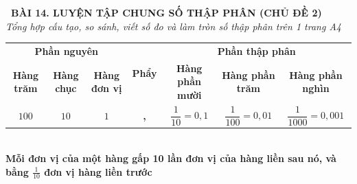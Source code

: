 \documentclass[14pt,a4paper,oneside]{extbook}
\begin{document}
\noindent
\begin{tcolorbox}[
  enhanced,
  colback=teal!8!white,
  colframe=teal!80!black,
  arc=3mm,
  boxrule=1.1pt,
  width=\linewidth,
  halign=center,
  top=2.2mm, bottom=2.2mm,
  left=3mm, right=3mm,
  drop fuzzy shadow
]
  {\large\bfseries\color{teal!95!black}\faBookmark\ BÀI 14. LUYỆN TẬP CHUNG SỐ THẬP PHÂN (CHỦ ĐỀ 2)}\\[2pt]
  {\scriptsize\color{black!75}\itshape Tổng hợp cấu tạo, so sánh, viết số đo và làm tròn số thập phân trên 1 trang A4}
\end{tcolorbox}

\vspace{3.2mm}
\noindent
\begin{tcolorbox}[
  enhanced,
  title={\footnotesize\bfseries\color{white}\faTable\ 1. Bảng tổng kết đầy đủ các hàng của số thập phân},
  colback=blue!2!white,
  colframe=blue!75!black,
  arc=2.5mm, boxrule=0.8pt, top=1.8mm, bottom=1.8mm, left=2mm, right=2mm
]
  \scriptsize
  \centering
  \begin{tabular}{|c|c|c|c|c|c|c|}
    \hline
    \multicolumn{3}{|c|}{\textbf{Phần nguyên}} & \multirow{2}{*}{\textbf{Phẩy}} & \multicolumn{3}{c|}{\textbf{Phần thập phân}} \\ \cline{1-3} \cline{5-7}
    \textbf{Hàng trăm} & \textbf{Hàng chục} & \textbf{Hàng đơn vị} & & \textbf{Hàng phần mười} & \textbf{Hàng phần trăm} & \textbf{Hàng phần nghìn} \\ \hline
    $100$ & $10$ & $1$ & \textbf{,} & $\dfrac{1}{10} = 0,1$ & $\dfrac{1}{100} = 0,01$ & $\dfrac{1}{1000} = 0,001$ \\ \hline
  \end{tabular}\\[3pt]
  {\tiny\color{blue!85!black}\bfseries Mỗi đơn vị của một hàng gấp 10 lần đơn vị của hàng liền sau nó, và bằng $\frac{1}{10}$ đơn vị hàng liền trước}
\end{tcolorbox}

\vspace{3mm}
\end{document}
